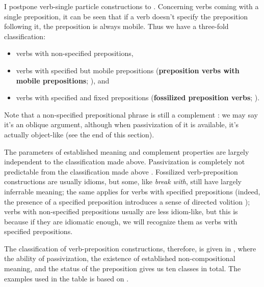 \documentclass[UTF8, a4paper, oneside, scheme=plain, 12pt]{ctexbook}
\newcommand*{\citepage}[1]{p.~{#1}}
\newcommand*{\concept}[1]{\textbf{#1}}
\newcommand{\form}[1]{\emph{#1}}
\begin{document}
I postpone verb-single particle constructions to .
Concerning verbs coming with a single preposition,
it can be seen that if a verb doesn't specify the preposition following it, 
the preposition is always mobile.
Thus we have a three-fold classification:
\begin{itemize}
    \item verbs with non-specified prepositions,
    \item verbs with specified but mobile prepositions 
    (\concept{preposition verbs with mobile prepositions}; \citealp[\citepage{273}]{cgel}), and 
    \item verbs with specified and fixed prepositions 
    (\concept{fossilized preposition verbs}; \citealp[\citepage{277}]{cgel}).
\end{itemize}
Note that a non-specified prepositional phrase is still a complement \citep[\citepage{273}]{cgel}:
we may say it's an oblique argument,
although when passivization of it is available,
it's actually object-like (see the end of this section).

The parameters of established meaning and complement properties
are largely independent to the classification made above.
Passivization is completely not predictable 
from the classification made above \citep[\citepage{276} {[11]}]{cgel}.
Fossilized verb-preposition constructions are usually idioms,
but some, like \form{break with}, 
still have largely inferrable meaning;
the same applies for verbs with specified prepositions
(indeed, the presence of a specified preposition introduces a sense of 
directed volition \citep[\citepage{293}]{dixon2005semantic});
verbs with non-specified prepositions usually are less idiom-like,
but this is because if they are idiomatic enough,
we will recognize them as verbs with specified prepositions.

The classification of verb-preposition constructions,
therefore, is given in ,
where the ability of passivization,
the existence of established non-compositional meaning, 
and the status of the preposition 
gives us ten classes in total.
The examples used in the table is based on \citet[\citepage{278}, {[17]}]{cgel}.
\end{document}
